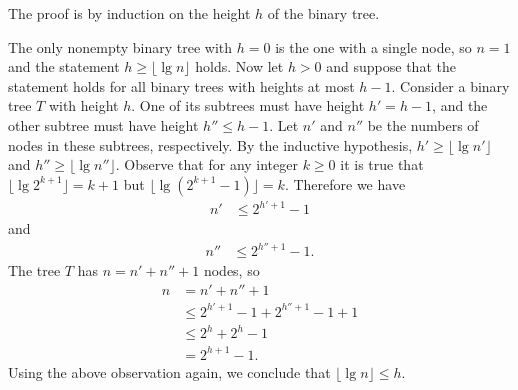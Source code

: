 \exercise
The proof is by induction on the height $h$ of the binary tree.

The only nonempty binary tree with $h=0$ is the one with a single node, so $n=1$ and the statement $h\ge\lfloor\lg n\rfloor$ holds.
Now let $h>0$ and suppose that the statement holds for all binary trees with heights at most $h-1$.
Consider a binary tree $T$ with height $h$.
One of its subtrees must have height $h'=h-1$, and the other subtree must have height $h''\le h-1$.
Let $n'$ and $n''$ be the numbers of nodes in these subtrees, respectively.
By the inductive hypothesis, $h'\ge\lfloor\lg n'\rfloor$ and $h''\ge\lfloor\lg n''\rfloor$.
Observe that for any integer $k\ge0$ it is true that $\lfloor\lg2^{k+1}\rfloor=k+1$ but $\lfloor\lg(2^{k+1}-1)\rfloor=k$.
Therefore we have
\begin{align*}
    n' &\le 2^{h'+1}-1
\end{align*}
and
\begin{align*}
    n'' &\le 2^{h''+1}-1.
\end{align*}
The tree $T$ has $n=n'+n''+1$ nodes, so
\begin{align*}
    n &= n'+n''+1 \\
    &\le 2^{h'+1}-1+2^{h''+1}-1+1 \\
    &\le 2^h+2^h-1 \\
    &= 2^{h+1}-1.
\end{align*}
Using the above observation again, we conclude that $\lfloor\lg n\rfloor\le h$.
